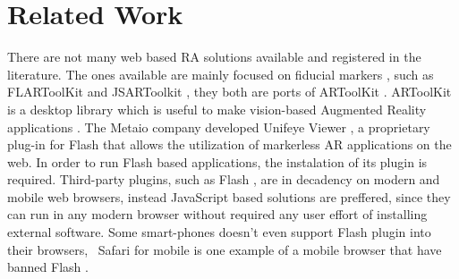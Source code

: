 
\section{Related Work} %
\label{sec:ar_library_for_the_web:related_work}

There are not many web based RA solutions available and registered in the literature. The ones available are mainly focused on fiducial markers \cite{Cho1998}, such as FLARToolKit \cite{Yan2011} and JSARToolkit \cite{JSARToolkit2011}, they both are ports of ARToolKit \cite{Hirokazu2002}. ARToolKit is a desktop library which is useful to make vision-based Augmented Reality applications \cite{Hirokazu2002}. The Metaio company developed Unifeye Viewer \cite{Metaio2009}, a proprietary plug-in for Flash \cite{Flash2013} that allows the utilization of markerless AR applications on the web. In order to run Flash \cite{Flash2013} based applications, the instalation of its plugin is required. Third-party plugins, such as Flash \cite{Flash2013}, are in decadency on modern and mobile web browsers, instead JavaScript \cite{International2009} based solutions are preffered, since they can run in any modern browser without required any user effort of installing external software. Some smart-phones doesn't even support Flash \cite{Flash2013} plugin into their browsers, \eg\ Safari for mobile \cite{Safari2013} is one example of a mobile browser that have banned Flash \cite{Flash2013}.

